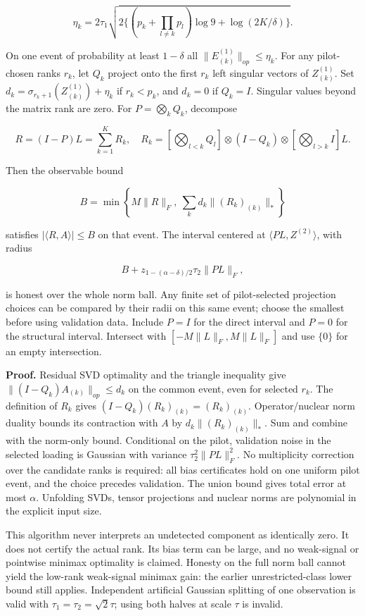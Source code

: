 \documentclass[
  10pt,
]{article}
\begin{document}
\[\eta_k=2\tau_1\sqrt{2\{(p_k+\prod_{l\ne k}p_l)\log9+
\log(2K/\delta)\}}.\]

On one event of probability at least \(1-\delta\) all
\(\|E^{(1)}_{(k)}\|_{op}\le\eta_k\). For any pilot-chosen ranks \(r_k\),
let \(Q_k\) project onto the first \(r_k\) left singular vectors of
\(Z^{(1)}_{(k)}\). Set \(d_k=\sigma_{r_k+1}(Z^{(1)}_{(k)})+\eta_k\) if
\(r_k<p_k\), and \(d_k=0\) if \(Q_k=I\). Singular values beyond the
matrix rank are zero. For \(P=\bigotimes_k Q_k\), decompose

\[R=(I-P)L=\sum_{k=1}^K R_k,\quad
R_k=\left[\bigotimes_{l<k}Q_l\right]\otimes(I-Q_k)
\otimes\left[\bigotimes_{l>k}I\right]L.\]

Then the observable bound

\[B=\min\left\{M\|R\|_F,\ \sum_k d_k\|(R_k)_{(k)}\|_*\right\}\]

satisfies \(|\langle R,A\rangle|\le B\) on that event. The interval
centered at \(\langle PL,Z^{(2)}\rangle\), with radius

\[B+z_{1-(\alpha-\delta)/2}\tau_2\|PL\|_F,\]

is honest over the whole norm ball. Any finite set of pilot-selected
projection choices can be compared by their radii on this same event;
choose the smallest before using validation data. Include \(P=I\) for
the direct interval and \(P=0\) for the structural interval. Intersect
with \([-M\|L\|_F,M\|L\|_F]\) and use \(\{0\}\) for an empty
intersection.

\textbf{Proof.} Residual SVD optimality and the triangle inequality give
\(\|(I-Q_k)A_{(k)}\|_{op}\le d_k\) on the common event, even for
selected \(r_k\). The definition of \(R_k\) gives
\((I-Q_k)(R_k)_{(k)}=(R_k)_{(k)}\). Operator/nuclear norm duality bounds
its contraction with \(A\) by \(d_k\|(R_k)_{(k)}\|_*\). Sum and combine
with the norm-only bound. Conditional on the pilot, validation noise in
the selected loading is Gaussian with variance \(\tau_2^2\|PL\|_F^2\).
No multiplicity correction over the candidate ranks is required: all
bias certificates hold on one uniform pilot event, and the choice
precedes validation. The union bound gives total error at most
\(\alpha\). Unfolding SVDs, tensor projections and nuclear norms are
polynomial in the explicit input size.

This algorithm never interprets an undetected component as identically
zero. It does not certify the actual rank. Its bias term can be large,
and no weak-signal or pointwise minimax optimality is claimed. Honesty
on the full norm ball cannot yield the low-rank weak-signal minimax
gain: the earlier unrestricted-class lower bound still applies.
Independent artificial Gaussian splitting of one observation is valid
with \(\tau_1=\tau_2=\sqrt2\tau\); using both halves at scale \(\tau\)
is invalid.
\end{document}
